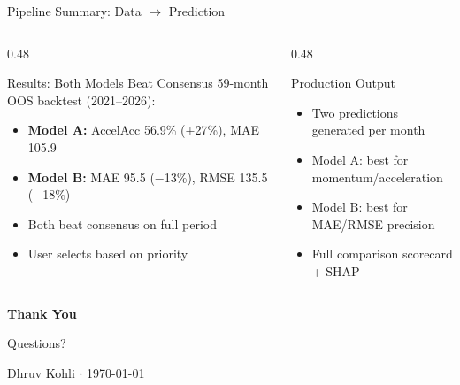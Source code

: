 \documentclass[aspectratio=169,10pt]{beamer}
\begin{document}
\begin{frame}{Pipeline Summary: Data $\to$ Prediction}
\vspace{0.3cm}
\begin{columns}[T]
\begin{column}{0.48\textwidth}
\begin{exampleblock}{Results: Both Models Beat Consensus}
\footnotesize
59-month OOS backtest (2021--2026):
\begin{itemize}\scriptsize
  \item \textbf{Model A:} AccelAcc 56.9\% ($+$27\%), MAE 105.9
  \item \textbf{Model B:} MAE 95.5 ($-$13\%), RMSE 135.5 ($-$18\%)
  \item Both beat consensus on full period
  \item User selects based on priority
\end{itemize}
\end{exampleblock}
\end{column}
\begin{column}{0.48\textwidth}
\begin{block}{Production Output}
\footnotesize
\begin{itemize}
  \item Two predictions generated per month
  \item Model A: best for momentum/acceleration
  \item Model B: best for MAE/RMSE precision
  \item Full comparison scorecard + SHAP
\end{itemize}
\end{block}
\end{column}
\end{columns}
\end{frame}

\begin{frame}[plain]
\begin{center}
\vfill
{\Huge\bfseries\color{pitblue} Thank You}

\vspace{0.5cm}
{\large Questions?}

\vspace{1cm}
{\footnotesize Dhruv Kohli $\cdot$ \today}
\vfill
\end{center}
\end{frame}
\end{document}
